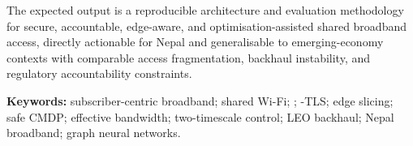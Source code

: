 The expected output is a reproducible architecture and evaluation methodology for secure, accountable, edge-aware, and optimisation-assisted shared broadband access, directly actionable for Nepal and generalisable to emerging-economy contexts with comparable access fragmentation, backhaul instability, and regulatory accountability constraints.

\vspace{6pt}
\noindent\textbf{Keywords:} subscriber-centric broadband; shared Wi-Fi; \radsec{}; \eap-TLS; edge slicing; safe CMDP; effective bandwidth; two-timescale control; LEO backhaul; Nepal broadband; graph neural networks.
